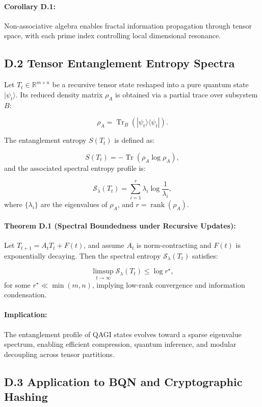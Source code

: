 \paragraph{Corollary D.1:}
Non-associative algebra enables fractal information propagation through tensor space, with each prime index controlling local dimensional resonance.

\subsection*{D.2 Tensor Entanglement Entropy Spectra}

Let \(T_t \in \mathbb{R}^{m \times n}\) be a recursive tensor state reshaped into a pure quantum state \(|\psi_t\rangle\). Its reduced density matrix \(\rho_A\) is obtained via a partial trace over subsystem \(B\):

\[
\rho_A = \operatorname{Tr}_B(|\psi_t\rangle \langle \psi_t|).
\]

The entanglement entropy \(S(T_t)\) is defined as:

\[
S(T_t) = -\operatorname{Tr}(\rho_A \log \rho_A),
\]
and the associated spectral entropy profile is:

\[
\mathcal{S}_\lambda(T_t) = \sum_{i=1}^{r} \lambda_i \log \frac{1}{\lambda_i},
\]
where \(\{\lambda_i\}\) are the eigenvalues of \(\rho_A\), and \(r = \operatorname{rank}(\rho_A)\).

\paragraph{Theorem D.1 (Spectral Boundedness under Recursive Updates):}
Let \(T_{t+1} = A_t T_t + F(t)\), and assume \(A_t\) is norm-contracting and \(F(t)\) is exponentially decaying. Then the spectral entropy \(\mathcal{S}_\lambda(T_t)\) satisfies:

\[
\limsup_{t \to \infty} \mathcal{S}_\lambda(T_t) \leq \log r^\star,
\]
for some \(r^\star \ll \min(m, n)\), implying low-rank convergence and information condensation.

\paragraph{Implication:}
The entanglement profile of QAGI states evolves toward a sparse eigenvalue spectrum, enabling efficient compression, quantum inference, and modular decoupling across tensor partitions.

\subsection*{D.3 Application to BQN and Cryptographic Hashing}

